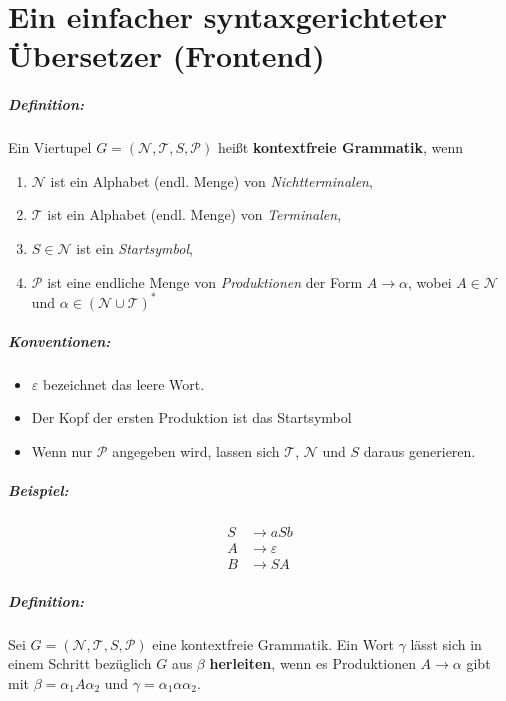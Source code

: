 \chapter{Ein einfacher syntaxgerichteter Übersetzer (Frontend)}
\paragraph{Definition:} Ein Viertupel $G = (\mathcal{N}, \mathcal{T}, S, \mathcal{P})$ heißt \textbf{kontextfreie Grammatik}, wenn
\begin{enumerate}
 \renewcommand{\theenumi}{(\roman{enumi})}
 \item $\mathcal{N}$ ist ein Alphabet (endl. Menge) von \emph{Nichtterminalen}, 
 \item $\mathcal{T}$ ist ein Alphabet (endl. Menge) von \emph{Terminalen}, 
 \item $S \in \mathcal{N}$ ist ein \emph{Startsymbol},
 \item $\mathcal{P}$ ist eine endliche Menge von \emph{Produktionen} der Form $A \to \alpha$, wobei $A \in \mathcal{N}$ und $\alpha \in (\mathcal{N} \cup \mathcal{T})^*$
\end{enumerate}

\paragraph{Konventionen:} 
\begin{itemize}
 \item $\varepsilon$ bezeichnet das leere Wort.
 \item Der Kopf der ersten Produktion ist das Startsymbol
 \item Wenn nur $\mathcal P$ angegeben wird, lassen sich $\mathcal T$, $\mathcal N$ und $S$ daraus generieren.
\end{itemize}

\paragraph{Beispiel:}
\begin{minipage}[t]{0.2\linewidth}
\begin{align*}
 S &\to aSb \\
 A &\to \varepsilon \\
 B &\to SA
\end{align*}
\end{minipage}

\paragraph{Definition:} Sei $G = (\mathcal{N}, \mathcal{T}, S, \mathcal{P})$ eine kontextfreie Grammatik. 
	Ein Wort $\gamma$ lässt sich in einem Schritt bezüglich $G$ aus $\beta$ \textbf{herleiten}, wenn es Produktionen $A \to \alpha$ gibt mit $\beta = \alpha_1A\alpha_2$ und $\gamma = \alpha_1\alpha\alpha_2$.

